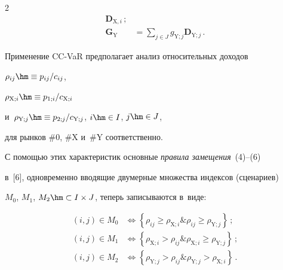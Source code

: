 \begin{multicols}{2}
\begin{align*}
\boldsymbol{D}_{\mathrm{X},i}\,;\\


 \boldsymbol{G}_{\mathrm{Y}} &=\sum\limits_{j\in J} g_{\mathrm{Y};j}


 \boldsymbol{D}_{\mathrm{Y};j}\,.


\end{align*}


  


  Применение CC-VaR предполагает анализ относительных доходов 


   $\rho_{ij}\hm\equiv p_{ij}/c_{ij}$, 


   $\rho_{\mathrm{X};i}\hm\equiv p_{1;i}/c_{\mathrm{X};i}$ 


и~$\rho_{\mathrm{Y};j}\hm\equiv p_{2;j}/c_{\mathrm{Y};j}$, $i\hm\in I$, $j\hm\in J$, 


для рынков \#0, \#X и~\#Y соответственно.





  С помощью этих характеристик основные \textit{правила замещения}~(4)--(6) 


в~[6], одновременно вводящие двумерные множества индексов (сценариев) 


$M_0$, $M_1$, $M_2 \hm\subset I\times  J$, теперь записываются в~виде:





\noindent


  \begin{align}


  (i,j)\in M_0 &\Leftrightarrow \left\{ \rho_{ij}\geq 


\rho_{\mathrm{X};i}\&\rho_{ij}\geq \rho_{\mathrm{Y};j}\right\}\,;\label{e3-ags}\\


  (i,j)\in M_1 &\Leftrightarrow \left\{ 


\rho_{\mathrm{X};i}>\rho_{ij}\&\rho_{\mathrm{X};i}\geq 


\rho_{\mathrm{Y};j}\right\}\,;\label{e4-ags}\\


  (i,j)\in M_2 &\Leftrightarrow  


\left\{ \rho_{\mathrm{Y};j}>\rho_{ij}\&\rho_{\mathrm{Y};j}> 


\rho_{\mathrm{X};i}\right\}\,.\label{e5-ags}


  \end{align}



\end{multicols}
